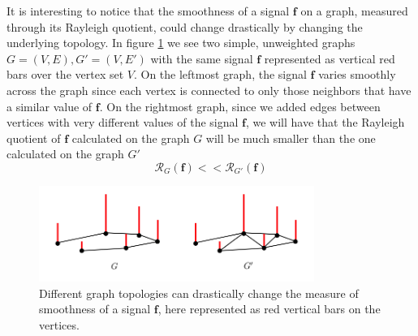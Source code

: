 \begin{remark}
	It is interesting to notice that the smoothness of a signal $\mathbf f$ on a graph, measured through its Rayleigh quotient, could change drastically by changing the underlying topology. In figure \ref{fig:graph} we see two simple, unweighted graphs $G=(V, E), G' =(V, E')$ with the same signal $\mathbf f$ represented as vertical red bars over the vertex set $V$. On the leftmost graph, the signal $\mathbf f$ varies smoothly across the graph since each vertex is connected to only those neighbors that have a similar value of $\mathbf f$. On the rightmost graph, since we added edges between vertices with very different values of the signal $\mathbf f$, we will have that the Rayleigh quotient of $\mathbf f$ calculated on the graph $G$ will be much smaller than the one calculated on the graph $G'$
	$$
	\mathcal R_{G}(\mathbf f) << \mathcal R_{G'}(\mathbf f)
	$$
\end{remark}
\begin{figure}
	\centering
	\includegraphics[width=0.8\textwidth]{figs/chapter1/graph.png}
	\caption{\label{fig:graph}Different graph topologies can drastically change the measure of smoothness of a signal $\mathbf f$, here represented as red vertical bars on the vertices.}
\end{figure}

